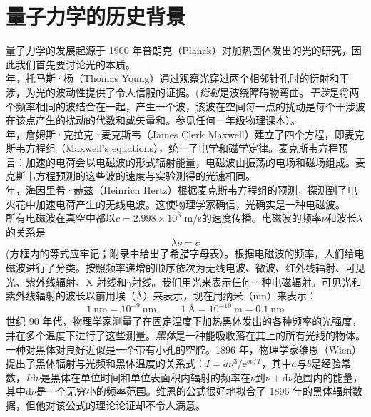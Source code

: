 	\section{量子力学的历史背景}
	\noindent 量子力学的发展起源于 1900 年普朗克（Planck）对加热固体发出的光的研究，因此我们首先要讨论光的本质。\\
	 年，托马斯·杨（Thomas Young）通过观察光穿过两个相邻针孔时的衍射和干涉，为光的波动性提供了令人信服的证据。(\textit{衍射}是波绕障碍物弯曲。\textit{干涉}是将两个频率相同的波结合在一起，产生一个波，该波在空间每一点的扰动是每个干涉波在该点产生的扰动的代数和或矢量和。参见任何一年级物理课本）。\\
	 年，詹姆斯·克拉克·麦克斯韦（James Clerk Maxwell）建立了四个方程，即麦克斯韦方程组（Maxwell's equations），统一了电学和磁学定律。麦克斯韦方程预言：加速的电荷会以电磁波的形式辐射能量，电磁波由振荡的电场和磁场组成。麦克斯韦方程预测的这些波的速度与实验测得的光速相同。\\
	 年，海因里希·赫兹（Heinrich Hertz）根据麦克斯韦方程组的预测，探测到了电火花中加速电荷产生的无线电波。这使物理学家确信，光确实是一种电磁波。\\
	\indent 所有电磁波在真空中都以$c = 2.998 \times 10^8$ m/s的速度传播。电磁波的频率$\nu$和波长$\lambda$的关系是
	\begin{equation}
		\boxed{\lambda \nu = c}
		\label{eq:1.1 wavelength and frequency}
	\end{equation}
	(方框内的等式应牢记；附录中给出了希腊字母表）。根据电磁波的频率，人们给电磁波进行了分类。按照频率递增的顺序依次为无线电波、微波、红外线辐射、可见光、紫外线辐射、X 射线和$\gamma$射线。我们用光来表示任何一种电磁辐射。可见光和紫外线辐射的波长以前用埃（\AA）来表示，现在用纳米（nm）来表示：
	\begin{equation}
		\boxed{1 \: \text{nm} = 10^{-9} \: \text{nm}, \qquad 1 \: \text{\AA}= 10^{-10} \: \text{m} = 0.1 \: \text{nm}}
		\label{units:1.2 nm and angstroms}
	\end{equation}
	 世纪 90 年代，物理学家测量了在固定温度下加热黑体发出的各种频率的光强度，并在多个温度下进行了这些测量。\textit{黑体}是一种能吸收落在其上的所有光线的物体。一种对黑体对良好近似是一个带有小孔的空腔。1896 年，物理学家维恩（Wien）提出了黑体辐射与光频和黑体温度的关系式：$I=a\nu^3/\text{e}^{b\nu /T}$，其中$a$与$b$是经验常数，$I \text{d} \nu$是黑体在单位时间和单位表面积内辐射的频率在$\nu$到$\nu + \text{d} \nu$范围内的能量，其中$\text{d} \nu$是一个无穷小的频率范围。维恩的公式很好地拟合了 1896 年的黑体辐射数据，但他对该公式的理论论证却不令人满意。\\

